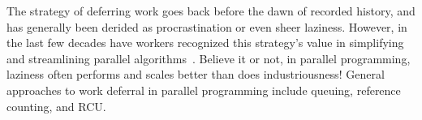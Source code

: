 

The strategy of deferring work goes back before the dawn of recorded
history, and has generally been derided as procrastination or
even sheer laziness.
However, in the last few decades have workers recognized this strategy's value
in simplifying and streamlining parallel algorithms~\cite{Kung80,HMassalinPhD}.
Believe it or not, in parallel programming, laziness often performs and
scales better than does industriousness!
General approaches to work deferral in parallel programming include
queuing, reference counting, and RCU.






